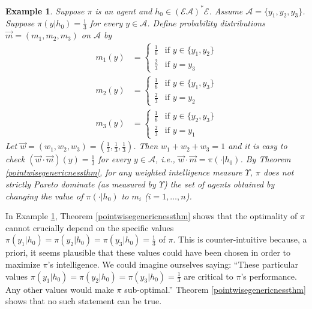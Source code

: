 \documentclass[twoside]{article}
\newtheorem{example}[theorem]{Example}
\begin{document}
\begin{example}
\label{genericnessexample}
    Suppose $\pi$ is an agent and $h_0\in(\mathcal E\mathcal A)^*\mathcal E$.
    Assume $\mathcal A=\{y_1,y_2,y_3\}$.
    Suppose $\pi(y|h_0)=\frac13$ for every $y\in\mathcal A$.
    Define probability distributions $\vec m=(m_1,m_2,m_3)$ on $\mathcal A$ by
    \begin{align*}
        m_1(y) &=
        \begin{cases}
            \frac16 &\mbox{if $y\in\{y_1,y_2\}$}\\
            \frac23 &\mbox{if $y=y_3$}
        \end{cases}\\
        m_2(y) &=
        \begin{cases}
            \frac16 &\mbox{if $y\in\{y_1,y_3\}$}\\
            \frac23 &\mbox{if $y=y_2$}
        \end{cases}\\
        m_3(y) &=
        \begin{cases}
            \frac16 &\mbox{if $y\in\{y_2,y_3\}$}\\
            \frac23 &\mbox{if $y=y_1$}
        \end{cases}
    \end{align*}
    Let $\vec w=(w_1,w_2,w_3)=(\frac13,\frac13,\frac13)$. Then $w_1+w_2+w_3=1$ and
    it is easy to check
    $(\vec w\cdot\vec m)(y)=\frac13$ for every $y\in\mathcal A$,
    i.e., $\vec w\cdot\vec m=\pi(\cdot|h_0)$.
    By Theorem \ref{pointwisegenericnessthm},
    for any weighted intelligence measure $\Upsilon$,
    $\pi$ does not strictly Pareto dominate (as measured by $\Upsilon$)
    the set of agents obtained by changing the value of $\pi(\cdot|h_0)$ to $m_i$
    ($i=1,\ldots,n$).
\end{example}

In Example \ref{genericnessexample}, Theorem \ref{pointwisegenericnessthm} shows
that the optimality of $\pi$ cannot crucially depend on the specific values
$\pi(y_1|h_0)=\pi(y_2|h_0)=\pi(y_3|h_0)=\frac13$ of $\pi$.
This is counter-intuitive because, a priori, it seems
plausible that these values could have been chosen
in order to maximize $\pi$'s intelligence. We could imagine ourselves
saying: ``These particular values $\pi(y_1|h_0)=\pi(y_2|h_0)=\pi(y_3|h_0)=\frac13$ are
critical to $\pi$'s
performance. Any other values would make $\pi$ sub-optimal.''
Theorem \ref{pointwisegenericnessthm} shows that no such statement can be true.
\end{document}
